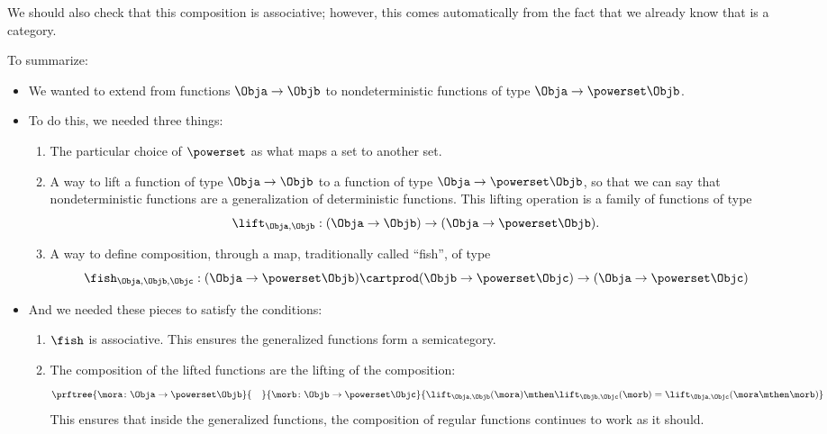We should also check that this composition is associative; however, this comes automatically from the fact that we already know that \Rel is a category.

To summarize:
\begin{itemize}
	\item We wanted to extend \Set from functions $\Obja \to \Objb$ to nondeterministic functions of type $\Obja \to \powerset\Objb$.
	\item To do this, we needed three things:
	      \begin{enumerate}
		      \item The particular choice of $\powerset$ as what maps a set to another set.
		      \item A way to lift a function of type $\Obja \to \Objb$ to a function of type $\Obja \to \powerset\Objb$, so that we can say that nondeterministic functions are a generalization of deterministic functions.
		            This lifting operation is a family of functions of type
		            \begin{equation}
			            \label{eq:monad-lift}
			            \lift_{\Obja, \Objb}: (\Obja \to \Objb) \to (\Obja \to \powerset\Objb).
		            \end{equation}
		      \item A way to define composition, through a map, traditionally called ``fish'', of type
		            \begin{equation}
			            \label{eq:monad-fish}
			            \fish_{\Obja, \Objb, \Objc}: (\Obja \to \powerset\Objb) \cartprod (\Objb \to \powerset\Objc)
			            \to (\Obja \to \powerset \Objc)
		            \end{equation}
	      \end{enumerate}
	\item And we needed these pieces to satisfy the conditions:
	      \begin{enumerate}
		      \item $\fish$ is associative.
		            This ensures the generalized functions form a semicategory.
		      \item The composition of the lifted functions are the lifting of the composition:
		            \begin{equation}
			            \label{eq:monad-fish-associative}
			            \prftree{\mora\colon \Obja \to \powerset\Objb}{\quad}{\morb\colon \Objb \to \powerset \Objc}{
				            \lift_{\Obja,\Objb}(\mora)\mthen\lift_{\Objb,\Objc}(\morb) =  \lift_{\Obja,\Objc}(\mora\mthen\morb)}
		            \end{equation}
		            This ensures that inside the generalized functions, the composition of regular functions continues to work as it should.
	      \end{enumerate}
\end{itemize}


